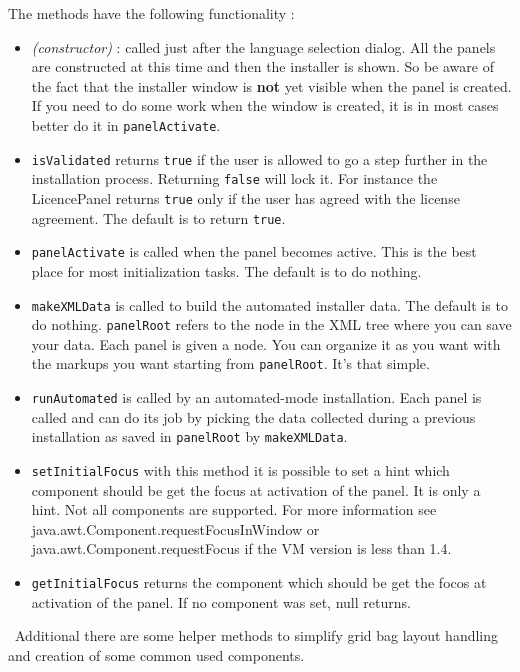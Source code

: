 The methods have the following functionality :\\
\begin{itemize}

  \item \textit{(constructor)} : called just after the language
  selection dialog. All the panels are constructed at this time and then
  the installer is shown. So be aware of the fact that the installer
  window is \textbf{not} yet visible when the panel is created. If you
  need to do some work when the window is created, it is in most cases
  better do it in \texttt{panelActivate}.\\

  \item \texttt{isValidated} returns \texttt{true} if the user is
  allowed to go a step further in the installation process. Returning
  \texttt{false} will lock it. For instance the LicencePanel returns
  \texttt{true} only if the user has agreed with the license agreement.
  The default is to return \texttt{true}.\\
  
  \item \texttt{panelActivate} is called when the panel becomes active.
  This is the best place for most initialization tasks. The default is
  to do nothing.\\
  
  \item \texttt{makeXMLData} is called to build the automated installer
  data. The default is to do nothing. \texttt{panelRoot} refers to the
  node in the XML tree where you can save your data. Each panel is given
  a node. You can organize it as you want with the markups you want
  starting from \texttt{panelRoot}. It's that simple.\\
  
  \item \texttt{runAutomated} is called by an automated-mode
  installation. Each panel is called and can do its job by picking the
  data collected during a previous installation as saved in
  \texttt{panelRoot} by \texttt{makeXMLData}.\\

  \item \texttt{setInitialFocus} with this method it is possible to set
  a hint which component should be get the focus at activation of the
  panel. It is only a hint. Not all components are supported. For more
  information see java.awt.Component.requestFocusInWindow or 
  java.awt.Component.requestFocus if the VM version is less than 1.4.\\
  
  \item \texttt{getInitialFocus} returns the component which should be get the
  focos at activation of the panel. If no component was set, null returns.\\

\end{itemize}\
Additional there are some helper methods to simplify grid bag layout handling
and creation of some common used components.

